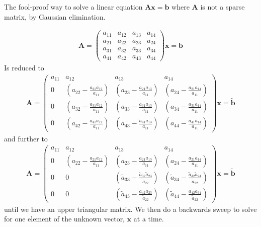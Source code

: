 The fool-proof way to solve a linear equation $\mathbf{A}\mathbf{x} = \mathbf{b}$ where $\mathbf{A}$ is not a sparse matrix, by Gaussian elimination.

\begin{align}
  \mathbf{A} = 
 \left( \begin{array}{rrrr}
 a_{11} & a_{12} & a_{13} & a_{14} \\
 a_{21} & a_{22} & a_{23} & a_{24} \\
 a_{31} & a_{32} & a_{33} & a_{34} \\
 a_{41} & a_{42} & a_{43} & a_{44}
 \end{array} \right)\mathbf{x} = \mathbf{b}
\end{align}
Is reduced to
\begin{align}
  \mathbf{A} = 
 \left( \begin{array}{rrrr}
 a_{11} & a_{12} & a_{13} & a_{14} \\
 0 & (a_{22}-\frac{a_{21}a_{12}}{a_{11}}) & (a_{23}-\frac{a_{21}a_{13}}{a_{11}}) & (a_{24}-\frac{a_{21}a_{14}}{a_{11}}) \\
 0 & (a_{32}-\frac{a_{31}a_{12}}{a_{11}}) & (a_{33}-\frac{a_{31}a_{13}}{a_{11}}) & (a_{34}-\frac{a_{31}a_{14}}{a_{11}}) \\
 0 & (a_{42}-\frac{a_{41}a_{12}}{a_{11}}) & (a_{43}-\frac{a_{41}a_{13}}{a_{11}}) & (a_{44}-\frac{a_{41}a_{14}}{a_{11}})
 \end{array} \right)\mathbf{x} = \tilde{\mathbf{b}}
\end{align}
and further to
\begin{align}
  \mathbf{A} = 
 \left( \begin{array}{rrrr}
 a_{11} & a_{12} & a_{13} & a_{14} \\
 0 & (a_{22}-\frac{a_{21}a_{12}}{a_{11}}) & (a_{23}-\frac{a_{21}a_{13}}{a_{11}}) & (a_{24}-\frac{a_{21}a_{14}}{a_{11}}) \\
 0 & 0 & (\tilde{a}_{33}-\frac{\tilde{a}_{32}\tilde{a}_{23}}{\tilde{a}_{22}}) & (\tilde{a}_{34}-\frac{\tilde{a}_{32}\tilde{a}_{24}}{\tilde{a}_{22}}) \\
 0 & 0 & (\tilde{a}_{43}-\frac{\tilde{a}_{42}\tilde{a}_{23}}{\tilde{a}_{22}}) & (\tilde{a}_{44}-\frac{\tilde{a}_{42}\tilde{a}_{34}}{\tilde{a}_{22}})
 \end{array} \right)\mathbf{x} = \tilde{\mathbf{b}}
\end{align}
until we have an upper triangular matrix. We then do a backwards sweep to solve for one element of the unknown vector, $\mathbf{x}$ at a time. 

